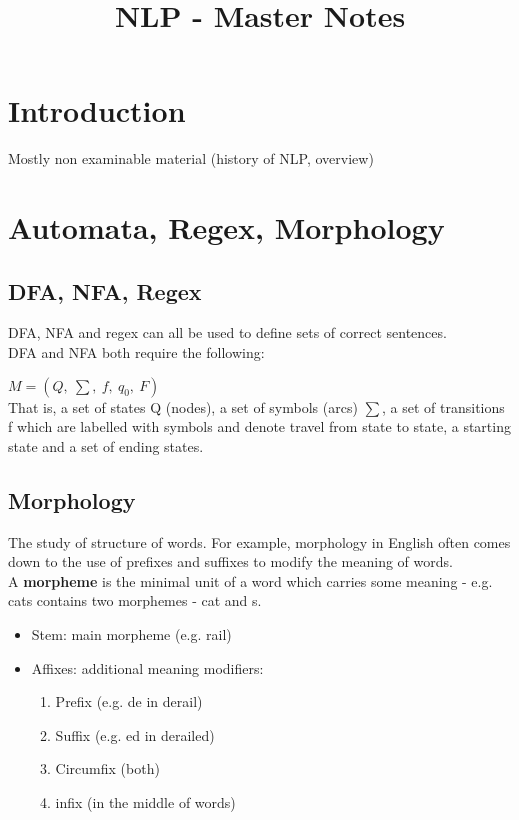 \documentclass[]{article}
\title{NLP - Master Notes}
\begin{document}
	\maketitle
	
	\section{Introduction}
    
    Mostly non examinable material (history of NLP, overview)
    
	\section{Automata, Regex, Morphology}
	
	\subsection{DFA, NFA, Regex}
	DFA, NFA and regex can all be used to define sets of correct sentences. \\
	
	DFA and NFA both require the following: 
	
	$M = (Q, \: \sum, \: \mathit{f}, \: q_0, \: F)$ \\
	That is, a set of states Q (nodes), a set of symbols (arcs) $\sum$, a set of transitions f which are labelled with symbols and denote travel from state to state, a starting state and a set of ending states. \\
	
    \subsection{Morphology}
	
	The study of structure of words. For example, morphology in English often comes down to the use of prefixes and suffixes to modify the meaning of words. \\
	
	A \textbf{morpheme} is the minimal unit of a word which carries some meaning - e.g. cats contains two morphemes - cat and s.
	
	\begin{itemize}
	 \item Stem: main morpheme (e.g. rail)
	 \item Affixes: additional meaning modifiers:
        \begin{enumerate}
         \item Prefix (e.g. de in derail)
         \item Suffix (e.g. ed in derailed)
         \item Circumfix (both)
         \item infix (in the middle of words)
        \end{enumerate}
	\end{itemize}
\end{document}
